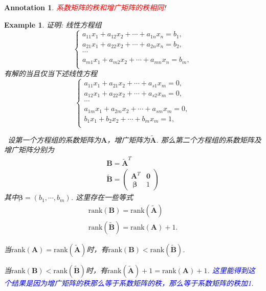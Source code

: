 \documentclass{article}
\newtheorem{example}[theorem]{Example}
\newtheorem{annotation}[theorem]{Annotation}
\newcommand{\hints}{{\color{blue} \text{hints}}}
\newcommand{\mbf}[1]{\bm{#1}}
\newcommand{\rank}[1]{\text{rank}\left(#1\right)} %
\newcommand{\redt}[1]{\textcolor{red}{#1}}
\newcommand{\bluet}[1]{\textcolor{blue}{#1}}
\begin{document}
\begin{annotation}
\rm \redt{系数矩阵的秩和增广矩阵的秩相同}!
\end{annotation}

\begin{example}
\rm 证明: 线性方程组
$$
\left\{
\begin{array}{l}
a_{11}x_1 + a_{12}x_2 + \cdots + a_{1n}x_n = b_1, \\
a_{21}x_1 + a_{22}x_2 + \cdots + a_{2n}x_n = b_2, \\
\cdots \\
a_{m1}x_1 + a_{m2}x_2 + \cdots + a_{mn}x_n = b_m, \\
\end{array} \right.
$$
有解的当且仅当下述线性方程
$$
\left\{
\begin{array}{l}
a_{11}x_1 + a_{21}x_2 + \cdots + a_{s1}x_m = 0, \\
a_{12}x_1 + a_{22}x_2 + \cdots + a_{s2}x_m = 0, \\
\cdots \\
a_{1m}x_1 + a_{2m}x_2 + \cdots +a_{sm}x_m = 0, \\
b_{1}x_1 + b_{2}x_2 + \cdots+ b_{m}x_m = 1, \\
\end{array} \right.
$$

\hints\ 设第一个方程组的系数矩阵为$\mbf{A}$，增广矩阵为$\tilde{\mbf{A}}$. 那么第二个方程组的系数矩阵及增广矩阵分别为
$$
\begin{array}{ll}
\mbf{B} = \tilde{\mbf{A}}^T \\
\tilde{\mbf{B}}= \begin{pmatrix}
\mbf{A}^T & \mbf{0} \\\
\mbf{\beta} & 1
\end{pmatrix}
\end{array}
$$
其中$\mbf{\beta} = (b_1,\cdots,b_m)$. 这里存在一些等式
$$
\begin{array}{ll}
\rank{\mbf{B}} = \rank{\tilde{\mbf{A}}} \\
\rank{\tilde{\mbf{B}}} = \rank{\mbf{A}} + 1.
\end{array}
$$

当$\rank{\mbf{A}} = \rank{\tilde{\mbf{A}}}$时，有$\rank{\mbf{B}} < \rank{\tilde{\mbf{B}}}$. 

当$\rank{\mbf{B}} < \rank{\tilde{\mbf{B}}}$时，有$\rank{\tilde{\mbf{A}}} + 1 = \rank{\mbf{A}} + 1$. \bluet{这里能得到这个结果是因为增广矩阵的秩那么等于系数矩阵的秩，那么等于系数矩阵的秩加1}. 
\end{example}
\end{document}
